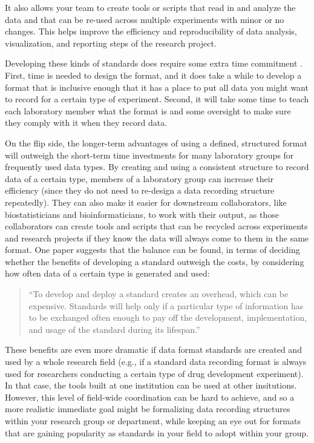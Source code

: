 \documentclass[]{tufte-book}
\begin{document}
It also allows your team to create tools or scripts that read in and
analyze the data and that can be re-used across multiple experiments with minor
or no changes. This helps improve the efficiency and reproducibility of data
analysis, visualization, and reporting steps of the research project.

Developing these kinds of standards does require some extra time commitment
\citep{brazma2006standards}. First, time is needed to design the format, and it does
take a while to develop a format that is inclusive enough that it has a
place to put all data you might want to record for a certain type of experiment.
Second, it will take some time to teach each laboratory member what the format
is and some oversight to make sure they comply with it when they record data.

On the flip side, the longer-term advantages of using a defined, structured
format will outweigh the short-term time investments for many laboratory groups
for frequently used data types. By creating and using a consistent structure to
record data of a certain type, members of a laboratory group can increase their
efficiency (since they do not need to re-design a data recording structure
repeatedly). They can also make it easier for downstream collaborators, like
biostatisticians and bioinformaticians, to work with their output, as those
collaborators can create tools and scripts that can be recycled across
experiments and research projects if they know the data will always come to them
in the same format. One paper suggests that the balance can be found, in terms of deciding whether
the benefits of developing a standard outweigh the costs, by considering how
often data of a certain type is generated and used:

\begin{quote}
``To develop and deploy a standard creates an overhead, which can be expensive.
Standards will help only if a particular type of information has to be
exchanged often enough to pay off the development, implementation, and usage
of the standard during its lifespan.'' \citep{brazma2006standards}
\end{quote}

These benefits are even more dramatic if data format standards
are created and used by a whole research field (e.g., if a standard data
recording format is always used for researchers conducting a certain type of
drug development experiment). In that case, the tools built at one institution
can be used at other insitutions. However, this level of field-wide coordination
can be hard to achieve, and so a more realistic immediate goal might be
formalizing data recording structures within your research group or department,
while keeping an eye out for formats that are gaining popularity as standards in
your field to adopt within your group.
\end{document}
